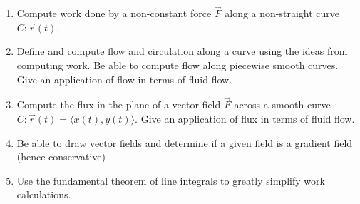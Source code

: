 
\begin{enumerate}
\item Compute work done by a non-constant force $\vec F$ along a
  non-straight curve $C\colon\vec r(t)$.
\item Define and compute flow and circulation along a curve using the
  ideas from computing work.  Be able to compute flow along piecewise
  smooth curves. Give an application of flow in terms of fluid flow.
\item Compute the flux in the plane of a vector field $\vec F$ across
  a smooth curve $C\colon\vec r(t) = \langle x(t),y(t)\rangle$.  Give an
  application of flux in terms of fluid flow.
\item Be able to draw vector fields and determine if a given field is a
  gradient field (hence conservative)
\item Use the fundamental theorem of line integrals to greatly
  simplify work calculations.
\end{enumerate}

